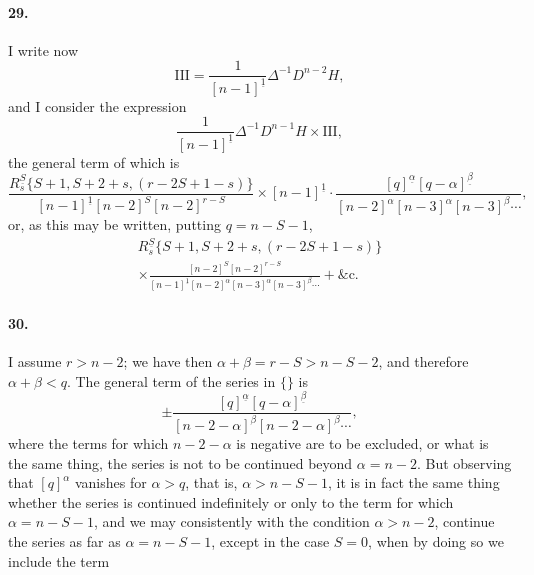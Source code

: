 \documentclass[11pt,a4paper]{book}
\begin{document}
\newpage

\paragraph{29.}
I  write  now
\[
\mathrm{III} = \frac{1}{[n-1]^{\underline{1}}} \Delta^{-1} D^{n-2} H,
\]
and  I  consider  the  expression
\[
\frac{1}{[n-1]^{\underline{1}}} \Delta^{-1} D^{n-1} H \times \mathrm{III},
\]
the  general  term  of  which  is
\[
\frac{R_s^{\underline{S}} \{S+1, S+2+s, (r-2S+1-s)\}}
     {[n-1]^{\underline{1}} [n-2]^S [n-2]^{r-S}}
  \times [n-1]^{\underline{1}} \cdot \frac{[q]^{\underline{\alpha}} [q-\alpha]^{\underline{\beta}}}
     {[n-2]^\alpha [n-3]^\alpha [n-3]^\beta \cdots},
\]
or,  as  this  may  be  written,  putting  $q = n - S - 1$,
\begin{multline*}
R_s^{\underline{S}} \{S+1, S+2+s, (r-2S+1-s)\} \\
\times \frac{[n-2]^S [n-2]^{r-S}}
     {[n-1]^{\underline{1}} [n-2]^\alpha [n-3]^\alpha [n-3]^\beta \cdots} + \text{\&c.}
\end{multline*}

\paragraph{30.}
I  assume  $r > n - 2$;  we  have  then  $\alpha + \beta = r - S > n - S - 2$,  and  therefore
$\alpha + \beta < q$.     The  general  term  of  the  series  in  $\{\}$  is
\[
\pm \frac{[q]^{\underline{\alpha}} [q-\alpha]^{\underline{\beta}}}
     {[n-2-\alpha]^\beta [n-2-\alpha]^\beta \cdots},
\]
where  the  terms  for  which  $n - 2 - \alpha$  is  negative  are  to  be  excluded,  or  what  is  the
same  thing,  the  series  is  not  to  be  continued  beyond  $\alpha = n - 2$.  But  observing  that
$[q]^\alpha$  vanishes  for  $\alpha > q$,  that  is,  $\alpha > n - S - 1$,  it  is  in  fact  the  same  thing  whether  the
series  is  continued  indefinitely  or  only  to  the  term  for  which  $\alpha = n - S - 1$,  and  we
may  consistently  with  the  condition  $\alpha > n - 2$,  continue  the  series  as  far  as  $\alpha = n - S - 1$,
except  in  the  case  $S = 0$,  when  by  doing  so  we  include  the  term

\newpage
\end{document}
